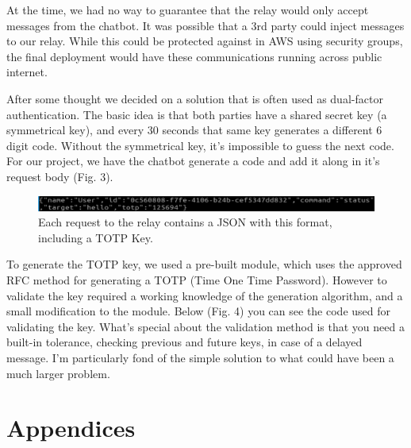 \documentclass[onecolumn, draftclsnofoot,10pt, compsoc]{IEEEtran}
\begin{document}
At the time, we had no way to guarantee that the relay would only accept messages from the chatbot.
It was possible that a 3rd party could inject messages to our relay.
While this could be protected against in AWS using security groups, the final deployment would have these communications running across public internet.

After some thought we decided on a solution that is often used as dual-factor authentication.
The basic idea is that both parties have a shared secret key (a symmetrical key), and every 30 seconds that same key generates a different 6 digit code.
Without the symmetrical key, it's impossible to guess the next code.
For our project, we have the chatbot generate a code and add it along in it's request body (Fig. 3).

\begin{figure}[h]
    \centering
    \captionsetup{format=hang,justification=raggedright,margin=2cm}
    \includegraphics[height=.7cm]{totpobject.png}
    \caption[Communication JSON]{Each request to the relay contains a JSON with this format, including a TOTP Key.}
    \label{fig:Communication JSON}
\end{figure}

To generate the TOTP key, we used a pre-built module, which uses the approved RFC method for generating a TOTP (Time One Time Password).
However to validate the key required a working knowledge of the generation algorithm, and a small modification to the module.
Below (Fig. 4) you can see the code used for validating the key.
What's special about the validation method is that you need a built-in tolerance, checking previous and future keys, in case of a delayed message.
I'm particularly fond of the simple solution to what could have been a much larger problem.

\clearpage
\section{Appendices}
\end{document}

